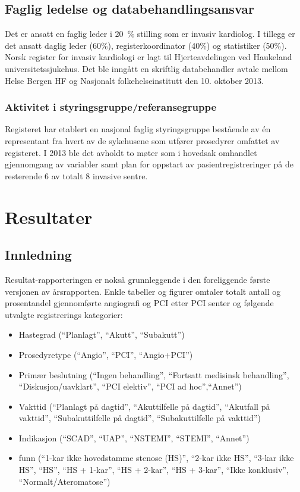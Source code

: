 \documentclass[norsk, a4paper]{report}
\begin{document}
\section{Faglig ledelse og databehandlingsansvar}\label{cha:led}
Det er ansatt en faglig leder i 20 \% stilling som er invasiv kardiolog. I tillegg er det ansatt daglig leder (60\%), registerkoordinator (40\%) og statistiker (50\%). Norsk register for invasiv kardiologi er lagt til Hjerteavdelingen ved Haukeland universitetssjukehus. Det ble inngått en skriftlig databehandler avtale mellom Helse Bergen HF og Nasjonalt folkehelseinstitutt den 10. oktober 2013.

\subsection{Aktivitet i styringsgruppe/referansegruppe}
Registeret har etablert en nasjonal faglig styringsgruppe bestående av én representant fra hvert av de sykehusene som utfører prosedyrer omfattet av registeret. I 2013 ble det avholdt to møter som i hovedsak omhandlet gjennomgang av variabler samt plan for oppstart av pasientregistreringer på de resterende 6 av totalt 8 invasive sentre.  






\chapter{Resultater}\label{cha:res}


\section{Innledning}
Resultat-rapporteringen er nokså grunnleggende i den foreliggende første versjonen av årsrapporten. Enkle tabeller og figurer omtaler totalt antall og prosentandel gjennomførte angiografi og PCI etter PCI senter og følgende utvalgte registrerings kategorier:

\begin{itemize}
  \item{Hastegrad (``Planlagt'', ``Akutt'', ``Subakutt'')}
  \item{Prosedyretype (``Angio'', ``PCI'', ``Angio+PCI'')}
  \item{Primær beslutning (``Ingen behandling'', ``Fortsatt medisinsk behandling'', ``Diskusjon/uavklart'', ``PCI elektiv'', ``PCI ad hoc'',``Annet'')}
  \item{Vakttid (``Planlagt på dagtid'', ``Akuttilfelle på dagtid'', ``Akutfall på vakttid'', ``Subakuttilfelle på dagtid'', ``Subakuttilfelle på vakttid'')}
  \item{Indikasjon (``SCAD'', ``UAP'', ``NSTEMI'', ``STEMI'', ``Annet'')}
  \item{funn (``1-kar ikke hovedstamme stenose (HS)'', ``2-kar ikke HS'', ``3-kar ikke HS'', ``HS'', ``HS + 1-kar'', ``HS + 2-kar'', ``HS + 3-kar'', ``Ikke konklusiv'', ``Normalt/Ateromatose'')}
\end{itemize}
\end{document}
